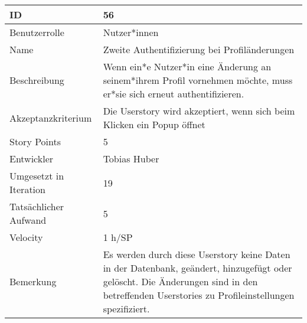 \begin{tabularx}{\textwidth}{|p{}|X|}
	\hline
	ID & 56\\
	\hline
	Benutzerrolle & Nutzer*innen\\
	\hline
	Name & Zweite Authentifizierung bei Profiländerungen\\
	\hline
	Beschreibung & Wenn ein*e Nutzer*in eine Änderung an seinem*ihrem Profil vornehmen möchte, muss er*sie sich erneut authentifizieren.\\
	\hline
	Akzeptanzkriterium & Die Userstory wird akzeptiert, wenn sich beim Klicken ein Popup öffnet \\
	\hline
	Story Points & 5\\
	\hline
	Entwickler & Tobias Huber\\
	\hline
	Umgesetzt in Iteration & 19\\
	\hline
	Tatsächlicher Aufwand & 5\\
	\hline
	Velocity & 1 h/SP\\
	\hline
	Bemerkung & Es werden durch diese Userstory keine Daten in der Datenbank, geändert, hinzugefügt oder gelöscht. Die Änderungen sind in den betreffenden Userstories zu Profileinstellungen spezifiziert.\\
	\hline
\end{tabularx}
\vspace{20pt}
